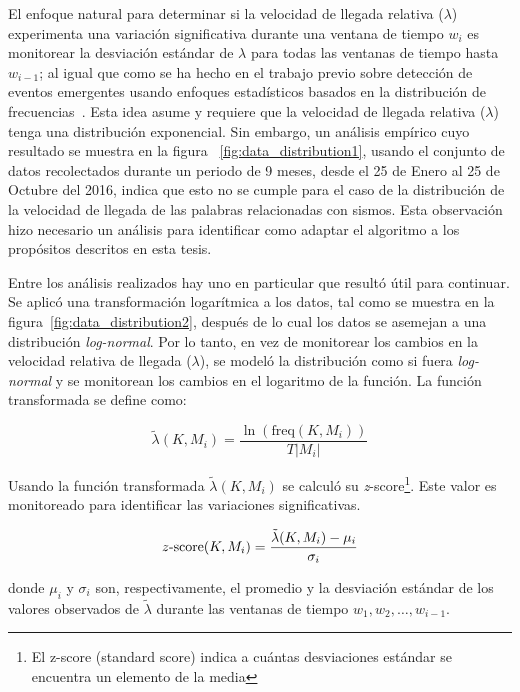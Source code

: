 El enfoque natural para determinar si la velocidad de llegada relativa ($\lambda$) experimenta una variación significativa durante una ventana de tiempo $w_i$ es monitorear la desviación estándar de $\lambda$ para todas las ventanas de tiempo hasta $w_{i-1}$; al igual que como se ha hecho en el trabajo previo sobre detección de eventos emergentes usando enfoques estadísticos basados en la distribución de frecuencias~\cite{kleinberg2003bursty, mathioudakis2010twittermonitor,
nguyen2013event}.
%
Esta idea asume y requiere que la velocidad de llegada relativa ($\lambda$) tenga una distribución exponencial. 
%
Sin embargo, un análisis empírico cuyo resultado se muestra en la figura ~\ref{fig:data_distribution1}, usando el conjunto de datos recolectados durante un periodo de 9 meses, desde el 25 de Enero al 25 de Octubre del 2016, indica que esto no se cumple para el caso de la distribución de la velocidad de llegada de las palabras relacionadas con sismos.
%
Esta observación hizo necesario un análisis para identificar como adaptar el algoritmo a los propósitos descritos en esta tesis.


Entre los análisis realizados hay uno en particular que resultó útil para continuar. Se aplicó una transformación logarítmica a los datos, tal como se muestra en la figura~\ref{fig:data_distribution2}, después de lo cual los datos se asemejan a una distribución {\em log-normal}.
%
Por lo tanto, en vez de monitorear los cambios en la velocidad relativa de llegada ($\lambda$), se modeló la distribución como si fuera {\em log-normal} y se monitorean los cambios en el logaritmo de la función. La función transformada se define como:

\begin{equation}
\label{eq:log_lambda}
\tilde{\lambda}(K, M_i) = \frac{\ln\left(\mathrm{freq}(K,M_i)\right)}{T |M_i|}
\end{equation}

Usando la función transformada $\tilde{\lambda}(K, M_i)$ se calculó su {\em z}-score\footnote{El z-score (standard score) indica a cuántas desviaciones estándar se encuentra un elemento de la media}. Este valor es monitoreado para identificar las variaciones significativas.  

\newcommand{\zscore}{\ensuremath{z\textnormal{-}\mathrm{score}}}
\begin{equation}
\label{eq:zscore}
\zscore(K, M_i) = \frac{\tilde{\lambda}(K, M_i)-\mu_i}{\sigma_i}
\end{equation}

\noindent donde $\mu_i$ y $\sigma_i$ son, respectivamente, el promedio y la desviación estándar de los valores observados de $\tilde\lambda$ durante las ventanas de tiempo $w_1, w_2, \dots, w_{i-1}$.

